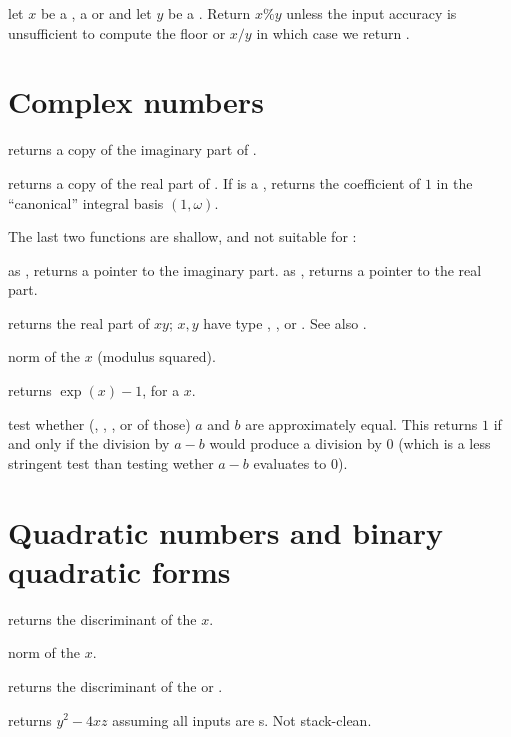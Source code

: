  let $x$ be a , a  or
 and let $y$ be a . Return $x\% y$ unless the input
accuracy is unsufficient to compute the floor or $x/y$ in which case we
return .

\section{Complex numbers}

 returns a copy of the imaginary part of .

 returns a copy of the real part of . If 
is a , returns the coefficient of $1$ in the ``canonical'' integral
basis $(1,\omega)$.

The last two functions are shallow, and not suitable for :

 as , returns a pointer to the imaginary
part.
 as , returns a pointer to the real part.

 returns the real part of $xy$;
$x,y$ have type , ,  or . See also
.

 norm of the  $x$ (modulus squared).

 returns $\exp(x)-1$, for a  $x$.

 test whether (, ,
, or  of those) $a$ and $b$ are approximately equal.
This returns $1$ if and only if the division by $a-b$ would produce a
division by $0$ (which is a less stringent test than testing wether $a-b$
evaluates to $0$).

\section{Quadratic numbers and binary quadratic forms}

 returns the discriminant of the  $x$.

 norm of the  $x$.

 returns the discriminant of the 
or  .

 returns $y^2 - 4xz$ assuming all
inputs are s. Not stack-clean.

